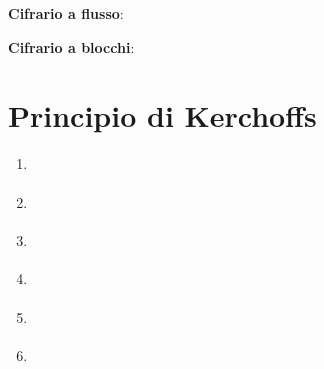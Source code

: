 \textsf{\small \textbf{Cifrario a flusso}: } %

\textsf{\small \textbf{Cifrario a blocchi}: } %




\section{Principio di Kerchoffs}

\textsf{\small } %

\textsf{\small } %


\begin{enumerate}
	\item \textsf{\small } %
	\item \textsf{\small } %
	\item \textsf{\small } %
	\item \textsf{\small } %
	\item \textsf{\small } %
	\item \textsf{\small } %
\end{enumerate}

